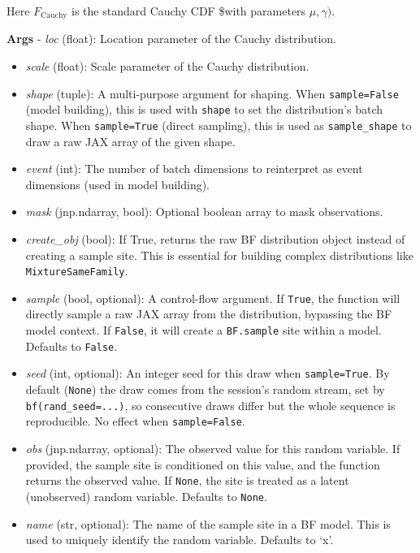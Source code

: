 \documentclass[
  letterpaper,
  DIV=11,
  numbers=noendperiod]{scrartcl}
\begin{document}
Here \(F_{\mathrm{Cauchy}}\) is the standard Cauchy CDF \$with
parameters \(\mu,\gamma)\).

\textbf{Args} - \emph{loc} (float): Location parameter of the Cauchy
distribution.

\begin{itemize}
\item
  \emph{scale} (float): Scale parameter of the Cauchy distribution.
\item
  \emph{shape} (tuple): A multi-purpose argument for shaping. When
  \texttt{sample=False} (model building), this is used with
  \texttt{shape} to set the distribution's batch shape. When
  \texttt{sample=True} (direct sampling), this is used as
  \texttt{sample\_shape} to draw a raw JAX array of the given shape.
\item
  \emph{event} (int): The number of batch dimensions to reinterpret as
  event dimensions (used in model building).
\item
  \emph{mask} (jnp.ndarray, bool): Optional boolean array to mask
  observations.
\item
  \emph{create\_obj} (bool): If True, returns the raw BF distribution
  object instead of creating a sample site. This is essential for
  building complex distributions like \texttt{MixtureSameFamily}.
\item
  \emph{sample} (bool, optional): A control-flow argument. If
  \texttt{True}, the function will directly sample a raw JAX array from
  the distribution, bypassing the BF model context. If \texttt{False},
  it will create a \texttt{BF.sample} site within a model. Defaults to
  \texttt{False}.
\item
  \emph{seed} (int, optional): An integer seed for this draw when
  \texttt{sample=True}. By default (\texttt{None}) the draw comes from
  the session's random stream, set by \texttt{bf(rand\_seed=...)}, so
  consecutive draws differ but the whole sequence is reproducible. No
  effect when \texttt{sample=False}.
\item
  \emph{obs} (jnp.ndarray, optional): The observed value for this random
  variable. If provided, the sample site is conditioned on this value,
  and the function returns the observed value. If \texttt{None}, the
  site is treated as a latent (unobserved) random variable. Defaults to
  \texttt{None}.
\item
  \emph{name} (str, optional): The name of the sample site in a BF
  model. This is used to uniquely identify the random variable. Defaults
  to `x'.
\end{itemize}
\end{document}
